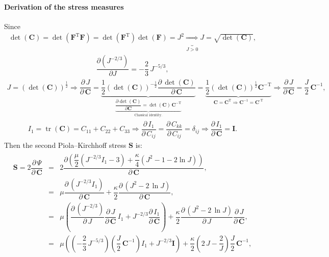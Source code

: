 \documentclass[11pt,a4paper]{article}
\newcommand{\tr}{\operatorname{tr}}
\newcommand{\Id}{\textbf{I}}
\begin{document}
\paragraph{Derivation of the stress measures} Since
%
\begin{eqnarray}
\det\left( \textbf{C}\right)=\det\left( \textbf{F}^{\text{T}}\textbf{F}\right)=\det\left( \textbf{F}^{\text{T}}\right)\det\left(\textbf{F}\right)=J^2\underbrace{\Rightarrow}_{J>0} \boxed{J=\sqrt{\det\left( \textbf{C}\right)}},
\end{eqnarray}
%
\begin{eqnarray}
\boxed{\dfrac{\partial (J^{-2/3})}{\partial J}
	=-\dfrac{2}{3}\,J^{-5/3}},
\end{eqnarray}
%
\begin{eqnarray}
J=\left( \det(\textbf{C})\right)^{\frac{1}{2}}\Rightarrow\dfrac{\partial\, J}{\partial\, \textbf{C}}=\underbrace{\dfrac{1}{2}\left( \det(\textbf{C})\right)^{-\frac{1}{2}}\dfrac{\partial\, \det(\textbf{C})}{\partial \,\textbf{C}}}_{\underbrace{\dfrac{\partial \det(\textbf{C})}{\partial \textbf{C}}=\det(\textbf{C})\,\textbf{C}^{-\text{T}}}_{\text{Classical identity.}}}=\underbrace{\dfrac{1}{2}\left( \det(\textbf{C})\right)^{\frac{1}{2}}\textbf{C}^{-\text{T}}}_{\textbf{C}=\textbf{C}^{\text{T}}\Rightarrow\textbf{C}^{-1}=\textbf{C}^{\text{-T}}}\Rightarrow\boxed{\dfrac{\partial \,J}{\partial\, \textbf{C}}=\dfrac{J}{2}\,\textbf{C}^{-1}},
\end{eqnarray}
%
\begin{eqnarray}
I_1=\tr(\textbf{C})=C_{11}+C_{22}+C_{33}\Rightarrow \dfrac{\partial\,I_1}{\partial\, C_{ij}}=\dfrac{\partial \,C_{kk}}{\partial\, C_{ij}}=\delta_{ij}\Rightarrow \boxed{\dfrac{\partial\, I_1}{\partial\,\textbf{C}}=\Id}.
\end{eqnarray}
%
Then the second Piola--Kirchhoff stress
$\textbf{S}$ is:
%
\begin{eqnarray}
\begin{array}{ccl}
\textbf{S}=2\dfrac{\partial \,\Psi}{\partial\,\textbf{C}}&=&
2\dfrac{\partial \left( \dfrac{\mu}{2}\left(J^{-2/3}I_1-3\right)
	+\dfrac{\kappa}{4}\left(J^2-1-2\ln J\right)\right) }{\partial\,\textbf{C}},\\[2ex]
&=&\mu\dfrac{\partial \,(J^{-2/3}I_1)}{\partial\,\textbf{C}}+\dfrac{\kappa}{2}\dfrac{\partial \,(J^{2}-2\,\ln J)}{\partial\,\textbf{C}},\\[2ex]
&=&\mu\left(\dfrac{\partial\,(J^{-2/3})}{\partial \,J}\dfrac{\partial \,J}{\partial\,\textbf{C}}\,I_1+J^{-2/3}\dfrac{\partial\,I_1}{\partial\,\textbf{C}}\right) +\dfrac{\kappa}{2}\dfrac{\partial\, (J^{2}-2\,\ln J)}{\partial\, J}\dfrac{\partial\, J}{\partial\,\textbf{C}},\\[2ex]
&=&\mu\left(\left(-\dfrac{2}{3}\,J^{-5/3}\right) \left(\dfrac{J}{2}\,\textbf{C}^{-1}\right) I_1+J^{-2/3}\textbf{I}\right) +\dfrac{\kappa}{2}\left(2\,J-\dfrac{2}{J} \right) \dfrac{J}{2}\,\textbf{C}^{-1},
	\end{array}
\end{eqnarray}
\end{document}
